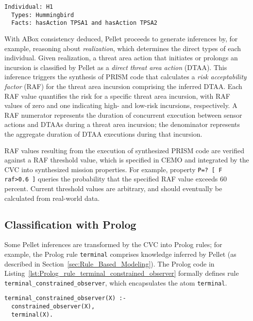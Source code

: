 \begin{lstlisting}[caption={OWL code for the individual H1},label=lst:OWL_individual_H1]
Individual: H1
  Types: Hummingbird
  Facts: hasAction TPSA1 and hasAction TPSA2
\end{lstlisting}

With ABox consistency deduced, Pellet proceeds to generate inferences by, for example, reasoning about \emph{realization}, which determines the direct types of each individual. Given realization, a threat area action that initiates or prolongs an incursion is classified by Pellet as a \emph{direct threat area action} (DTAA). This inference triggers the synthesis of PRISM code that calculates a \emph{risk acceptability factor} (RAF) for the threat area incursion comprising the inferred DTAA\@. Each RAF value quantifies the risk for a specific threat area incursion, with RAF values of zero and one indicating high- and low-risk incursions, respectively. A RAF numerator represents the duration of concurrent execution between sensor actions and DTAAs during a threat area incursion; the denominator represents the aggregate duration of DTAA executions during that incursion.

RAF values resulting from the execution of synthesized PRISM code are verified against a RAF threshold value, which is specified in CEMO and integrated by the CVC into synthesized mission properties. For example, property \texttt{P=? [ F raf>0.6 ]} queries the probability that the specified RAF value exceeds 60 percent. Current threshold values are arbitrary, and should eventually be calculated from real-world data.

\subsection{Classification with Prolog}

\noindent Some Pellet inferences are transformed by the CVC into Prolog rules; for example, the Prolog rule \texttt{terminal} comprises knowledge inferred by Pellet (as described in Section~\ref{sec:Rule_Based_Modeling}). The Prolog code in Listing~\ref{lst:Prolog_rule_terminal_constrained_observer} formally defines rule \texttt{terminal\_constrained\_observer}, which encapsulates the atom \texttt{terminal}.

\begin{lstlisting}[caption={Prolog code for rule terminal\_constrain\-ed\_observer},label=lst:Prolog_rule_terminal_constrained_observer]
terminal_constrained_observer(X) :-
  constrained_observer(X),
  terminal(X).
\end{lstlisting}

